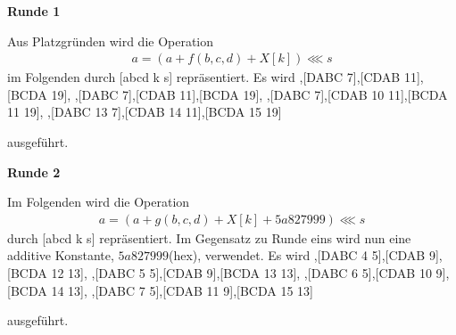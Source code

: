 \documentclass[12pt,a4paper]{scrartcl}
\newcommand{\spar}{\par\vspace{10pt}\noindent}
\numberwithin{equation}{section}
\numberwithin{myalgctr}{section}
\numberwithin{mytheoremctr}{section}
\begin{document}
	\noindent \textbf{Runde 1}\par \label{round1-md4}\noindent
	Aus Platzgründen wird die Operation 
	\begin{align}
		a = (a + f(b,c,d) + X[k])\lll s \label{operation1-md4}
	\end{align}
	im Folgenden durch [abcd k s] repräsentiert. Es wird
	\vspace{.5cm}
	\newline
	[ABCD \:\:0 3],\hfill [DABC \: 7],\hfill [CDAB \: 11],\hfill [BCDA \: 19],
	\newline
	[ABCD \:\:4 3],\hfill [DABC \: 7],\hfill [CDAB \: 11],\hfill [BCDA \: 19],
	\newline
	[ABCD \:\:8 3],\hfill [DABC \: 7],\hfill [CDAB 10 11],\hfill [BCDA 11 19],
	\newline
	[ABCD 12 3],\hfill [DABC 13 7],\hfill [CDAB 14 11],\hfill [BCDA 15 19]\:
	\spar
	ausgeführt.\\
	\vspace{.5cm}
	
	\noindent \textbf{Runde 2}\par\noindent
	Im Folgenden wird die Operation 
	\begin{align}
	a = (a + g(b,c,d) + X[k] + 5a827999)\lll s
	\end{align}
	durch [abcd k s] repräsentiert. Im Gegensatz zu Runde eins wird nun eine additive Konstante, $5a827999$(hex), verwendet. Es wird
	\vspace{.5cm}
	\newline
	[ABCD 0 3],\hfill [DABC 4 5],\hfill [CDAB \: 9],\hfill [BCDA 12 13],
	\newline
	[ABCD 1 3],\hfill [DABC 5 5],\hfill [CDAB \: 9],\hfill [BCDA 13 13],
	\newline
	[ABCD 2 3],\hfill [DABC 6 5],\hfill [CDAB 10 9],\hfill [BCDA 14 13],
	\newline
	[ABCD 3 3],\hfill [DABC 7 5],\hfill [CDAB 11 9],\hfill [BCDA 15 13]\:
	\spar
	ausgeführt.\\
	\vspace{.5cm}
	
\end{document}
